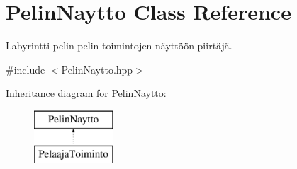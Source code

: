 \hypertarget{class_pelin_naytto}{}\section{Pelin\+Naytto Class Reference}
\label{class_pelin_naytto}


Labyrintti-\/pelin pelin toimintojen näyttöön piirtäjä.  




{\ttfamily \#include $<$Pelin\+Naytto.\+hpp$>$}

Inheritance diagram for Pelin\+Naytto\+:\begin{figure}[H]
\begin{center}
\leavevmode
\includegraphics[height=2.000000cm]{class_pelin_naytto}
\end{center}
\end{figure}
